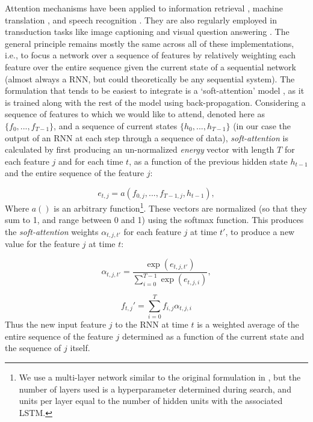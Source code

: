 \documentclass[utf8]{frontiersSCNS} %
\begin{document}
Attention mechanisms have been applied to information retrieval \cite{Moritz}, machine translation \cite{Luong2015}, and speech recognition \cite{Bahdanau}. They are also regularly employed in transduction tasks like image captioning \cite{XuKELVINXU} and visual question answering \cite{Ye2017}. The general principle remains mostly the same across all of these implementations, i.e., to focus a network over a sequence of features by relatively weighting each feature over the entire sequence given the current state of a sequential network (almost always a RNN, but could theoretically be any sequential system). The formulation that tends to be easiest to integrate is a `soft-attention' model \cite{XuKELVINXU}, as it is trained along with the rest of the model using back-propagation. Considering a sequence of features to which we would like to attend, denoted here as $\{f_0, ..., f_{T-1}\}$, and a sequence of current states $\{h_0, ..., h_{T-1}\}$ (in our case the output of an RNN at each step through a sequence of data), \emph{soft-attention} is calculated by first producing an un-normalized {\em energy} vector with length $T$ for each feature $j$ and for each time $t$, as a function of the previous hidden state $h_{t-1}$ and the entire sequence of the feature $j$: 

\begin{equation} \label{eq:attn_nrg}
  e_{t, j} = a(f_{0, j},..., f_{T-1, j}, h_{t-1}),
\end{equation}
Where $a()$ is an arbitrary function\footnote{We use a multi-layer network similar to the original formulation in \cite{XuKELVINXU}, but the number of layers used is a hyperparameter determined during search, and units per layer equal to the number of hidden units with the associated LSTM.}. These vectors are normalized (so that they sum to 1, and range between 0 and 1) using the softmax function. This produces the {\em soft-attention} weights $\alpha_{t,j,t'}$ for each feature $j$ at time $t'$, to produce a new value for the feature $j$ at time $t$:

\begin{equation}
  \alpha_{t,j,t'} =  \frac{\exp(e_{t,j,t'})}{\sum_{i=0}^{T-1}\exp(e_{t,j,i})},
\end{equation}

\begin{equation} \label{eq:attn}
    f_{t,j}' = \sum_{i=0}^{T} f_{i,j} \alpha_{t,j,i}
  \end{equation}
Thus the new input feature $j$ to the RNN at time $t$ is a weighted average of the entire sequence of the feature $j$ determined as a function of the current state and the sequence of $j$ itself.
\end{document}
